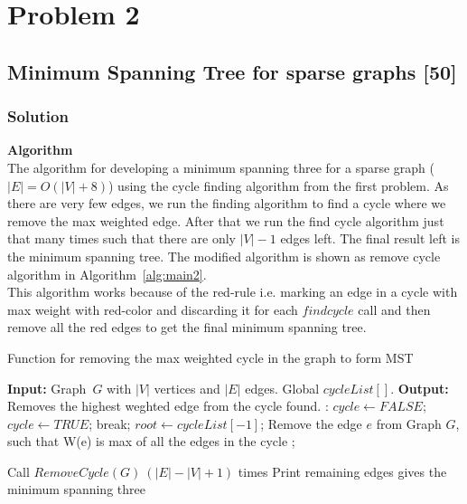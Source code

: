 \documentclass{article}
\begin{document}
\section*{Problem 2}
\subsection*{Minimum Spanning Tree for sparse graphs [50]} 
\subsubsection*{Solution}
\textbf{Algorithm}\\
The algorithm for developing a minimum spanning three for a sparse graph ($|E|=O(|V|+8)$) using the cycle finding algorithm from the first problem. As there are very few edges, we run the finding algorithm to find a cycle where we remove the max weighted edge. After that we run the find cycle algorithm just that many times such that there are only $|V|-1$ edges left. The final result left is the minimum spanning tree. The modified algorithm is shown as remove cycle algorithm in Algorithm~\ref{alg:main2}.\\ This algorithm works because of the red-rule i.e. marking an edge in a cycle with max weight with red-color and discarding it for each $findcycle$ call and then remove all the red edges to get the final minimum spanning tree.
\begin{algorithm}
\caption{Function for removing the max weighted cycle in the graph to form MST}
\label{alg:main2}
\begin{algorithmic}[1]
\State \textbf{Input:} Graph\ $G$ with $|V|$ vertices and $|E|$ edges. Global $cycleList[]$.
\State \textbf{Output:} Removes the highest weghted edge from the cycle found.
:
\State $cycle\leftarrow FALSE;$
\State $cycle\leftarrow TRUE$;
\State break;
\EndIf
\EndIf
\EndFor
{}
\State $root \leftarrow cycleList[-1]$;
\State Remove the edge $e$ from Graph $G$, such that W(e) is max of all the edges in the cycle
\EndFor
\EndIf
\State \Return;
\EndFunction

\State Call $RemoveCycle(G)\ (|E|-|V|+1)$ times
\State Print remaining edges gives the minimum spanning three
\end{algorithmic}
\end{algorithm}
\end{document}
